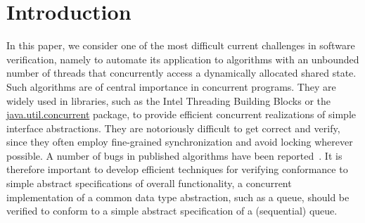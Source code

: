 \section{Introduction}
\label{sec:introduction}
%
In this paper, we consider one of the most difficult current challenges in
software verification, namely to automate its
application to algorithms with an unbounded number of
threads that concurrently access a dynamically allocated shared state.
Such algorithms are of central importance in concurrent programs. They
are widely used in libraries,
such as the Intel Threading Building Blocks or
the \url{java.util.concurrent}  package,
to provide efficient concurrent realizations of
simple interface abstractions.
They are notoriously difficult to get correct and verify, since they
often employ fine-grained synchronization and avoid locking wherever
possible. A number of bugs  in published
algorithms have been reported~\cite{DDGJLMMSS:dcas,MiSc:correction}.
It is therefore important to develop efficient techniques for
verifying conformance to simple abstract specifications of overall
functionality, a concurrent implementation of a common
data type abstraction, such as a queue, should be verified to conform
to a simple abstract specification of a (sequential) queue.


